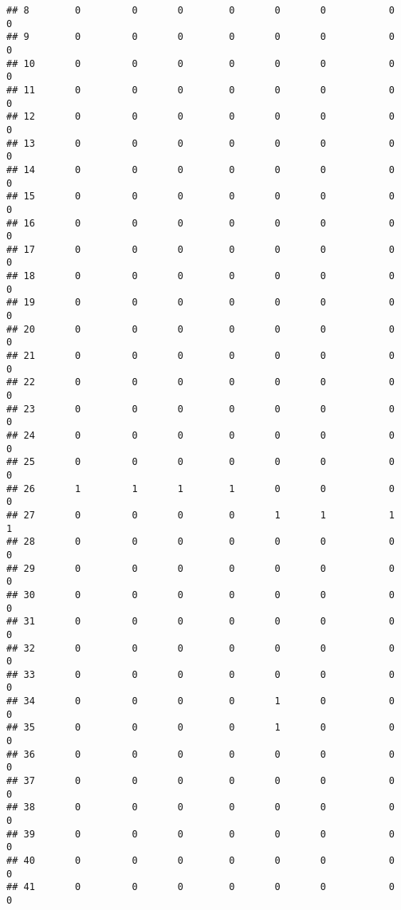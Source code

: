 \documentclass[
]{article}
\begin{document}
\begin{verbatim}
## 8        0         0       0        0       0       0           0       0
## 9        0         0       0        0       0       0           0       0
## 10       0         0       0        0       0       0           0       0
## 11       0         0       0        0       0       0           0       0
## 12       0         0       0        0       0       0           0       0
## 13       0         0       0        0       0       0           0       0
## 14       0         0       0        0       0       0           0       0
## 15       0         0       0        0       0       0           0       0
## 16       0         0       0        0       0       0           0       0
## 17       0         0       0        0       0       0           0       0
## 18       0         0       0        0       0       0           0       0
## 19       0         0       0        0       0       0           0       0
## 20       0         0       0        0       0       0           0       0
## 21       0         0       0        0       0       0           0       0
## 22       0         0       0        0       0       0           0       0
## 23       0         0       0        0       0       0           0       0
## 24       0         0       0        0       0       0           0       0
## 25       0         0       0        0       0       0           0       0
## 26       1         1       1        1       0       0           0       0
## 27       0         0       0        0       1       1           1       1
## 28       0         0       0        0       0       0           0       0
## 29       0         0       0        0       0       0           0       0
## 30       0         0       0        0       0       0           0       0
## 31       0         0       0        0       0       0           0       0
## 32       0         0       0        0       0       0           0       0
## 33       0         0       0        0       0       0           0       0
## 34       0         0       0        0       1       0           0       0
## 35       0         0       0        0       1       0           0       0
## 36       0         0       0        0       0       0           0       0
## 37       0         0       0        0       0       0           0       0
## 38       0         0       0        0       0       0           0       0
## 39       0         0       0        0       0       0           0       0
## 40       0         0       0        0       0       0           0       0
## 41       0         0       0        0       0       0           0       0

\end{verbatim}
\end{document}
